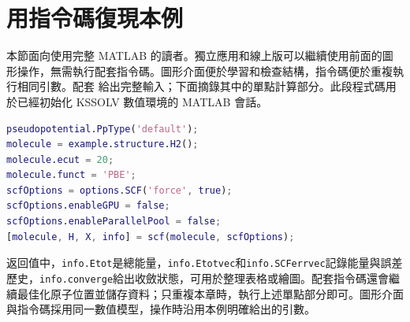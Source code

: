 \section{用指令碼復現本例}

本節面向使用完整 MATLAB\regmark{} 的讀者。獨立應用和線上版可以繼續使用前面的圖形操作，無需執行配套指令碼。圖形介面便於學習和檢查結構，指令碼便於重複執行相同引數。配套  給出完整輸入；下面摘錄其中的單點計算部分。此段程式碼用於已經初始化 KSSOLV 數值環境的 MATLAB\regmark{} 會話。

\begin{lstlisting}[language=Matlab]
pseudopotential.PpType('default');
molecule = example.structure.H2();
molecule.ecut = 20;
molecule.funct = 'PBE';
scfOptions = options.SCF('force', true);
scfOptions.enableGPU = false;
scfOptions.enableParallelPool = false;
[molecule, H, X, info] = scf(molecule, scfOptions);
\end{lstlisting}

返回值中，\texttt{info.Etot}是總能量，\texttt{info.Etotvec}和\texttt{info.SCFerrvec}記錄能量與誤差歷史，\texttt{info.converge}給出收斂狀態，可用於整理表格或繪圖。配套指令碼還會繼續最佳化原子位置並儲存資料；只重複本章時，執行上述單點部分即可。圖形介面與指令碼採用同一數值模型，操作時沿用本例明確給出的引數。

